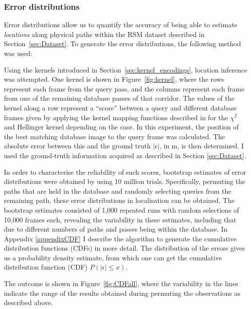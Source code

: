 \subsubsection{Error distributions}
\label{sec:CDFs}
Error distributions allow us to quantify the accuracy of being able to estimate {\em locations} along physical paths within the RSM dataset described in Section~\ref{sec:Dataset}. To generate the error distributions, the following method was used: 

Using the kernels introduced in Section~\ref{sec:kernel_encodings}, location inference was attempted. One kernel is shown in Figure~\ref{fig:kernel}, where the rows represent each frame from the query pass, and the columns represent each frame from one of the remaining database passes of that corridor. The values of the kernel along a row represent a ``score'' between a query and different database frames given by applying the kernel mapping functions described in \citep{vedaldi2012efficient} for the $\chi^2$ and Hellinger kernel depending on the case. In this experiment, the position of the best matching database image to the query frame was calculated. The absolute error between this and the ground truth $|\epsilon|$, in m, is then determined. I used the ground-truth information acquired as described in Section \ref{sec:Dataset}. 

In order to characterise the reliability of such scores, bootstrap estimates of error distributions were obtained by using 10 million trials. Specifically, permuting the paths that are held in the database and randomly selecting queries from the remaining path, these error distributions in localisation can be obtained. The bootstrap estimates consisted of 1,000 repeated runs with random selections of 10,000 frames each, revealing the variability in these estimates, including that due to different numbers of paths and passes being within the database. In Appendix \ref{appendixCDF} I describe the algorithm to generate the cumulative distribution functions (CDFs) in more detail. The distribution of the errors gives us a probability density estimate, from which one can get the cumulative distribution function (CDF) $P(|\epsilon| \leq x)$. 

The outcome is shown in Figure~\ref{fig:CDFall}, where the variability in the lines indicate the range of the results obtained during permuting the observations as described above.

